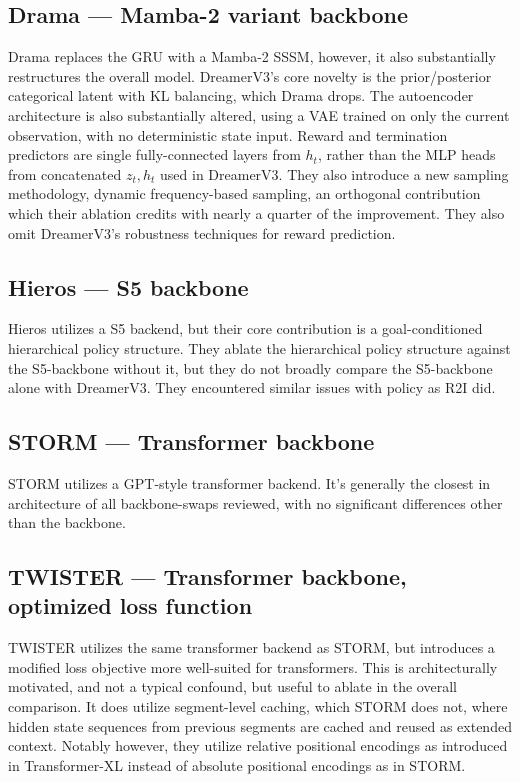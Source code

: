 \documentclass{article}
\begin{document}
\subsection{Drama --- Mamba-2 variant backbone}
Drama\cite{drama} replaces the GRU with a Mamba-2 SSSM\cite{mamba2}, however, it also substantially restructures the overall model. DreamerV3's core novelty is the prior/posterior categorical latent with KL balancing, which Drama drops. The autoencoder architecture is also substantially altered, using a VAE trained on only the current observation, with no deterministic state input. Reward and termination predictors are single fully-connected layers from \(h_t\), rather than the MLP heads from concatenated \(z_t, h_t\) used in DreamerV3. They also introduce a new sampling methodology, dynamic frequency-based sampling, an orthogonal contribution which their ablation credits with nearly a quarter of the improvement. They also omit DreamerV3's robustness techniques for reward prediction.
\subsection{Hieros --- S5 backbone}
Hieros\cite{hieros} utilizes a S5\cite{s5} backend, but their core contribution is a goal-conditioned hierarchical policy structure. They ablate the hierarchical policy structure against the S5-backbone without it, but they do not broadly compare the S5-backbone alone with DreamerV3. They encountered similar issues with policy as R2I did.
\subsection{STORM --- Transformer backbone}
STORM\cite{storm} utilizes a GPT-style transformer\cite{gpt} backend. It's generally the closest in architecture of all backbone-swaps reviewed, with no significant differences other than the backbone.
\subsection{TWISTER --- Transformer backbone, optimized loss function}
TWISTER\cite{twister} utilizes the same transformer backend as STORM, but introduces a modified loss objective more well-suited for transformers. This is architecturally motivated, and not a typical confound, but useful to ablate in the overall comparison. It does utilize segment-level caching, which STORM does not, where hidden state sequences from previous segments are cached and reused as extended context. Notably however, they utilize relative positional encodings as introduced in Transformer-XL\cite{transformerxl} instead of absolute positional encodings as in STORM.
\end{document}
